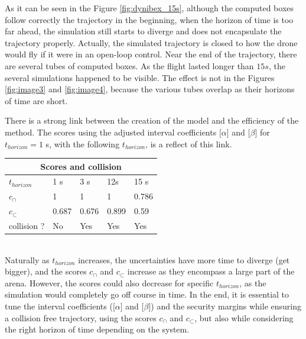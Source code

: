 \documentclass[letterpaper, 10 pt, conference]{ieeeconf}  %
\begin{document}
As it can be seen in the Figure \ref{fig:dynibex_15s}, although the computed boxes follow correctly the trajectory in the beginning, when the horizon of time is too far ahead, the simulation still starts to diverge and does not encapsulate the trajectory properly. Actually, the simulated trajectory is closed to how the drone would fly if it were in an open-loop control. Near the end of the trajectory, there are several tubes of computed boxes. As the flight lasted longer than $15 s$, the several simulations happened to be visible. The effect is not in the Figures \ref{fig:image3} and \ref{fig:image4}, because the various tubes overlap as their horizons of time are short.

There is a strong link between the creation of the model and the efficiency of the method. The scores using the adjusted interval coefficients $\lbrack \alpha \rbrack$ and $\lbrack \beta \rbrack$ for $t_{horizon} = 1$ s, with the following $t_{horizon}$, is a reflect of this link.\\

\begin{tabular}{ |p{1.5cm}||p{1.2cm}|p{1.2cm}|p{1.2cm}|p{1.2cm}| }
 \hline
 \multicolumn{5}{|c|}{Scores and collision} \\
 \hline
 $t_{horizon}$ & 1 s  & 3 s & 12s & 15 s \\
 \hline
 $c_{\cap}$    & 1    & 1   & 1   & 0.786\\
 \hline
 $c_{\subset}$ & 0.687 & 0.676 & 0.899 &0.59\\
 \hline
collision ? & No & Yes & Yes & Yes\\
 \hline
\end{tabular}\\

\vspace{0.2 cm}Naturally as $t_{horizon}$ increases, the uncertainties have more time to diverge (get bigger), and the scores $c_{\cap}$ and $c_{\subset}$ increase as they encompass a large part of the arena. However, the scores could also decrease for specific $t_{horizon}$, as the simulation would completely go off course in time. In the end, it is essential to tune the interval coefficients ($\lbrack \alpha \rbrack$ and $\lbrack \beta \rbrack$) and the security margins while ensuring a collision free trajectory, using the scores $c_{\cap}$ and $c_{\subset}$, but also while considering the right horizon of time depending on the system. 
\end{document}
